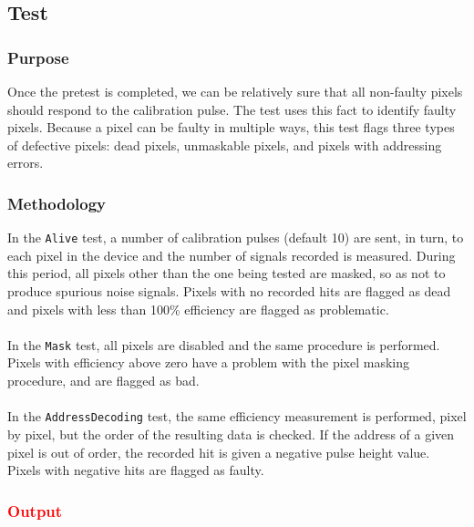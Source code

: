 
\subsection{\alivetest Test}
\label{ss:alive}

\subsubsection{Purpose}

Once the pretest is completed, we can be relatively sure that all non-faulty pixels should respond to the calibration pulse.
The \alivetest test uses this fact to identify faulty pixels.
Because a pixel can be faulty in multiple ways, this test flags three types of defective pixels:
dead pixels, unmaskable pixels, and pixels with addressing errors.

\subsubsection{Methodology}

In the {\tt Alive} test, a number of calibration pulses (default 10) are sent, in turn,
to each pixel in the device and the number of signals recorded is measured.
During this period, all pixels other than the one being tested are masked, so as not to produce spurious noise signals.
Pixels with no recorded hits are flagged as dead and pixels with less than 100\% efficiency are flagged as problematic.
\\\\
In the {\tt Mask} test, all pixels are disabled and the same procedure is performed.
Pixels with efficiency above zero have a problem with the pixel masking procedure, and are flagged as bad.
\\\\
In the {\tt AddressDecoding} test, the same efficiency measurement is performed, pixel by pixel,
but the order of the resulting data is checked.
If the address of a given pixel is out of order, the recorded hit is given a negative pulse height value.
Pixels with negative hits are flagged as faulty.

\subsubsection{\textcolor{red}{Output}}
